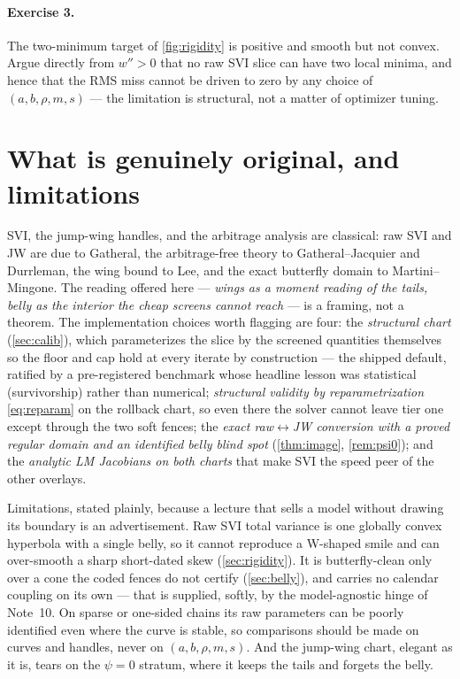 \documentclass[11pt]{article}
\begin{document}
\paragraph{Exercise 3.}
The two-minimum target of \cref{fig:rigidity} is positive and smooth but not
convex.  Argue directly from $w''>0$ that no raw SVI slice can have two local
minima, and hence that the RMS miss cannot be driven to zero by any choice of
$(a,b,\rho,m,s)$ --- the limitation is structural, not a matter of optimizer
tuning.

\section{What is genuinely original, and limitations}
\label{sec:original}

SVI, the jump-wing handles, and the arbitrage analysis are classical: raw SVI
and JW are due to Gatheral, the arbitrage-free theory to Gatheral--Jacquier and
Durrleman, the wing bound to Lee, and the exact butterfly domain to
Martini--Mingone.  The reading offered here --- \emph{wings as a moment reading
of the tails, belly as the interior the cheap screens cannot reach} --- is a
framing, not a theorem.  The implementation choices worth flagging are four:
the \emph{structural chart} (\cref{sec:calib}), which parameterizes the slice
by the screened quantities themselves so the floor and cap hold at every
iterate by construction --- the shipped default, ratified by a
pre-registered benchmark whose headline lesson was statistical
(survivorship) rather than numerical; \emph{structural validity by
reparametrization} \eqref{eq:reparam} on the rollback chart, so even there
the solver
cannot leave tier one except through the two soft fences; the \emph{exact
raw$\leftrightarrow$JW conversion with a proved regular domain and an identified
belly blind spot} (\cref{thm:image}, \cref{rem:psi0}); and the \emph{analytic
LM Jacobians on both charts} that make SVI the speed peer of the other
overlays.

Limitations, stated plainly, because a lecture that sells a model without drawing
its boundary is an advertisement.  Raw SVI total variance is one globally convex
hyperbola with a single belly, so it cannot reproduce a W-shaped smile and can
over-smooth a sharp short-dated skew (\cref{sec:rigidity}).  It is
butterfly-clean only over a cone the coded fences do not certify
(\cref{sec:belly}), and carries no calendar coupling on its own --- that is
supplied, softly, by the model-agnostic hinge of Note~10.  On sparse or
one-sided chains its raw parameters can be poorly identified even where the
curve is stable, so comparisons should be made on curves and handles, never on
$(a,b,\rho,m,s)$.  And the jump-wing chart, elegant as it is, tears on the
$\psi=0$ stratum, where it keeps the tails and forgets the belly.
\end{document}
